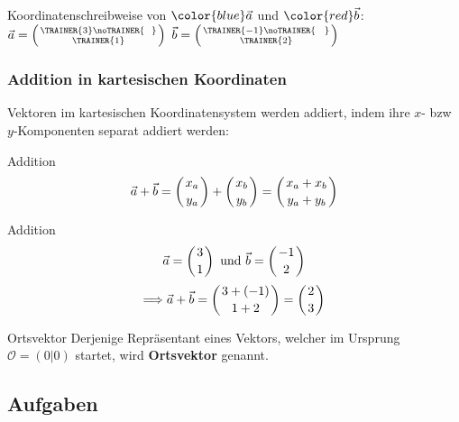 Koordinatenschreibweise von $\color{blue}\vec{a}$ und $\color{red}\vec{b}$:\,\,
$\vec{a} = \left( \TRAINER{3}\noTRAINER{\,\,\,\,} \atop \TRAINER{1} \right)$
$\vec{b} = \left( \TRAINER{-1}\noTRAINER{\,\,\,\,\,} \atop \TRAINER{2} \right)$
\newpage
\subsubsection{Addition in kartesischen Koordinaten}
Vektoren im kartesischen Koordinatensystem werden addiert, indem ihre
$x$- bzw $y$-Komponenten separat addiert werden:

\begin{gesetz}{Addition}{}
$$\vec{a} + \vec{b} =   \left(x_a \atop y_a \right)  + \left( x_b \atop y_b \right) =
  \left( x_a + x_b \atop y_a + y_b \right)$$
  \end{gesetz}

\begin{beispiel}{Addition}{}
  $$\vec{a} = \left(3\atop 1\right) \text{ und } \vec{b} = \left(-1
  \atop 2\right)$$
  $$\Longrightarrow \vec{a} + \vec{b} = \left(3 + (-1) \atop 1 +
  2\right) = \left(2 \atop 3\right)$$
  \end{beispiel}

\begin{definition}{Ortsvektor}{}
  Derjenige Repräsentant eines Vektors, welcher im Ursprung $\mathcal{O} = (0|0)$
  startet, wird \textbf{Ortsvektor} genannt.
\end{definition}




\subsection*{Aufgaben}    
\newpage




\newpage

